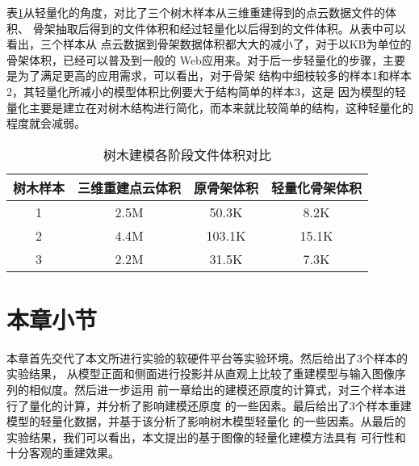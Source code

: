 表\ref{tab:lw}从轻量化的角度，对比了三个树木样本从三维重建得到的点云数据文件的体积、
骨架抽取后得到的文件体积和经过轻量化以后得到的文件体积。从表中可以看出，三个样本从
点云数据到骨架数据体积都大大的减小了，对于以KB为单位的骨架体积，已经可以普及到一般的
Web应用来。对于后一步轻量化的步骤，主要是为了满足更高的应用需求，可以看出，对于骨架
结构中细枝较多的样本1和样本2，其轻量化所减小的模型体积比例要大于结构简单的样本3，这是
因为模型的轻量化主要是建立在对树木结构进行简化，而本来就比较简单的结构，这种轻量化的
程度就会减弱。
\\
\begin{table}[H]
	\caption{树木建模各阶段文件体积对比}
	\centering
	\begin{tabular}{c|ccc} \label{tab:lw}
		树木样本	&	三维重建点云体积	& 原骨架体积	& 轻量化骨架体积\\
		\hline
		1			&   2.5M				& 50.3K			& 8.2K\\
		2			&	4.4M				& 103.1K		& 15.1K\\
		3			&	2.2M				& 31.5K			& 7.3K\\
	\end{tabular}
\end{table}

\section{本章小节}
本章首先交代了本文所进行实验的软硬件平台等实验环境。然后给出了3个样本的实验结果，
从模型正面和侧面进行投影并从直观上比较了重建模型与输入图像序列的相似度。然后进一步运用
前一章给出的建模还原度的计算式，对三个样本进行了量化的计算，并分析了影响建模还原度
的一些因素。最后给出了3个样本重建模型的轻量化数据，并基于该分析了影响树木模型轻量化
的一些因素。从最后的实验结果，我们可以看出，本文提出的基于图像的轻量化建模方法具有
可行性和十分客观的重建效果。


